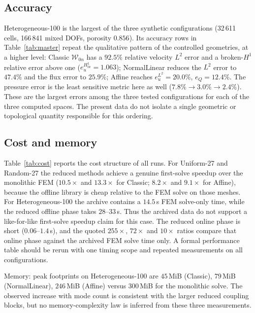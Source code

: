 \documentclass[11pt,a4paper]{article}
\newcommand{\Wspace}{\mathcal{W}}
\begin{document}
\subsection{Accuracy}
\label{sec:realacc}

Heterogeneous-100 is the largest of the three synthetic configurations
(32\,611 cells, 166\,841 mixed DOFs, porosity $0.856$).  Its accuracy
rows in Table~\ref{tab:master} repeat the qualitative pattern of the
controlled geometries, at a higher level: Classic $\Wspace_{0n}$ has a $92.5\%$ relative velocity
$L^2$ error and a broken-$H^1$ relative error above one ($e_u^{H^1_{\mathrm{br}}} = 1.063$); NormalLinear
reduces the $L^2$ error to $47.4\%$ and the flux error to $25.9\%$;
Affine reaches $e_u^{L^2}=20.0\%$, $e_Q=12.4\%$.  The pressure error is
the least sensitive metric here as well ($7.8\%\to3.0\%\to2.4\%$).
These are the largest errors among the three tested configurations for
each of the three computed spaces.  The present data do not isolate a
single geometric or topological quantity responsible for this ordering.

\subsection{Cost and memory}
\label{sec:realcost}

Table~\ref{tab:cost} reports the cost structure of all runs.  For
Uniform-27 and Random-27 the reduced methods achieve a genuine
first-solve speedup over the monolithic FEM ($10.5\times$ and $13.3\times$
for Classic; $8.2\times$ and $9.1\times$ for Affine), because the
offline library is cheap relative to the FEM solve on those meshes.
For Heterogeneous-100 the archive contains a $14.5\,$s FEM solve-only
time, while the reduced offline phase takes $28$--$33\,$s.  Thus the
archived data do not support a like-for-like first-solve speedup claim
for this case.  The reduced online phase is short ($0.06$--$1.4\,$s),
and the quoted $255\times$, $72\times$ and $10\times$ ratios compare
that online phase against the archived FEM solve time only.  A formal
performance table should be rerun with one timing scope and repeated
measurements on all configurations.

Memory: peak footprints on Heterogeneous-100 are $45$\,MiB (Classic),
$79$\,MiB (NormalLinear), $246$\,MiB (Affine) versus $300$\,MiB for the
monolithic solve.  The observed increase with mode count is consistent
with the larger reduced coupling blocks, but no memory-complexity law is
inferred from these three measurements.
\end{document}

